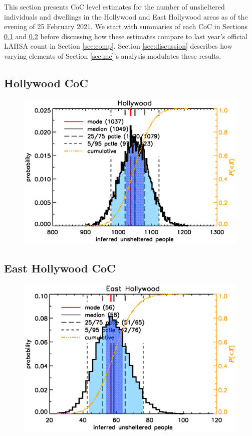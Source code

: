 \documentclass[11pt,twocolumn]{article}
\begin{document}
This section presents CoC level estimates for the number of unsheltered individuals and dwellings
in the Hollywood and East Hollywood areas as of the evening of 25 February 2021. We start with
summaries of each CoC in Sections \ref{sec:hWood} and \ref{sec:eHo} before discussing how these
estimates compare to last year's official LAHSA count in Section \ref{sec:comp}. Section \ref{sec:discussion}
describes how varying elements of Section \ref{sec:mc}'s analysis modulates these results.

\subsection{Hollywood CoC}
\label{sec:hWood}

\begin{figure}[h]
	\centering
	\includegraphics[width =\linewidth]{hWood/HollywoodDist}
	\caption{}
\end{figure}

\subsection{East Hollywood CoC}
\label{sec:eHo}

\begin{figure}[h]
	\centering
	\includegraphics[width =\linewidth]{eHo/EastHollywoodDist}
	\caption{}
\end{figure}
\end{document}
